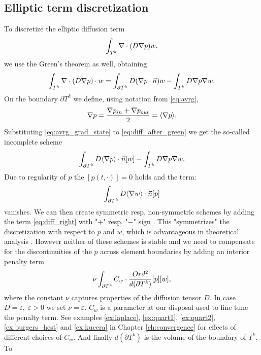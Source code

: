 \subsection{Elliptic term discretization}
\label{se:diff_term}
To discretize the elliptic diffusion term
$$
\int_{T^k}\nabla\cdot(D\nabla p) w,
$$
we use the Green's theorem as well, obtaining
\begin{equation}
\label{eq:diff_after_green}
\int_{T^k}\nabla \cdot (D \nabla p)\cdot w  = \int_{\partial T^k} D(\nabla p\cdot\vec{n}) w - \int_{T^k}
D\nabla p \nabla w.
\end{equation}
On the boundary $\partial T^k$ we define, using notation from \eqref{eq:avrg},
\begin{equation}
\nabla p = \frac{\nabla p_{in} + \nabla p_{out}}{2} = \langle\nabla p\rangle.
\label{eq:avrg_grad_state}
\end{equation}
Substituting \eqref{eq:avrg_grad_state} to \eqref{eq:diff_after_green} we get
the so-called incomplete scheme
\begin{equation}
\int_{\partial T^k} D \langle\nabla p\rangle \cdot \vec{n} [w] - \int_{T^k} D\nabla p
\nabla w.
\end{equation}
Due to regularity of $p$ the $[p(t, \cdot)] = 0$ holds \cite[p. 14]{Kucera} and the term:
\begin{equation}
\label{eq:diff_right}
\int_{\partial T^k} D \langle\nabla w \rangle\cdot \vec{n} [p]
\end{equation}
vanishes.
We can then create symmetric resp. non-symmetric schemes by adding the term
\eqref{eq:diff_right} with "$+$" resp. "$-$" sign \cite[p. 14]{Kucera}. This
"symmetrizes" the discretization with respect to $p$ and $w$, which is advantageous in
theoretical analysis \cite[p. 39]{Dolejsi2015}.
However neither of these schemes is stable and we need to compensate for the
discontinuities of the $p$ across element boundaries by adding an interior penalty term
\cite{Kucera, Antonietti2013, Dolejsi2015}
\begin{equation}
\nu \int_{\partial T^k} C_w \cdot \frac{Ord^2}{d(\partial T^k)} [p][w],
\end{equation}
where the constant $\nu$ captures properties of the diffusion tensor $D$. In case $D =
\varepsilon, \; \varepsilon > 0$ we set $\nu = \varepsilon$. $C_w$ is
a parameter at our disposal used to fine tune the penalty term.
See examples \ref{ex:laplace}, \ref{ex:quart1}, \ref{ex:quart2},
\ref{ex:burgers_hest} and \ref{ex:kucera} in Chapter
\ref{ch:convergence} for effects of different choices of $C_w$.
And finally $d(\partial T^k)$ is the volume of the boundary of $T^k$. To
